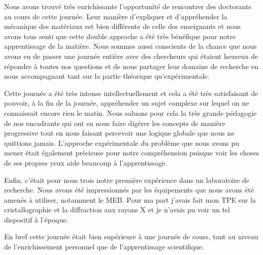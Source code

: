 Nous avons trouvé très enrichissante l'opportunité de rencontrer des doctorants au cours de cette journée. Leur manière d'expliquer et d'appréhender la mécanique des matériaux est bien différente de celle des enseignants et nous avons tous senti que cette double approche a été très bénéfique pour notre apprentissage de la matière. Nous sommes aussi conscients de la chance que nous avons eu de passer une journée entière avec des chercheurs qui étaient heureux de répondre à toutes nos questions et de nous partager leur domaine de recherche en nous accompagnant tant sur la partie théorique qu'expérimentale. 

Cette journée a été très intense intellectuellement et cela a été très satisfaisant de pouvoir, à la fin de la journée, appréhender un sujet complexe sur lequel on ne connaissait encore rien le matin. Nous saluons pour cela la très grande pédagogie de nos encadrants qui ont su nous faire digérer les concepts de manière progressive tout en nous faisant percevoir une logique globale que nous ne quittions jamais. L'approche expérimentale du problème que nous avons pu mener était également précieuse pour notre compréhension puisque voir les choses de ses propres yeux aide beaucoup à l'apprentissage.

Enfin, c'était pour nous trois notre première expérience dans un laboratoire de recherche. Nous avons été impressionnés par les équipements que nous avons été amenés à utiliser, notamment le MEB. Pour ma part j'avais fait mon TPE sur la cristallographie et la diffraction aux rayons X et je n'avais pu voir un tel dispositif à l'époque.

En bref cette journée était bien supérieure à une journée de cours, tant au niveau de l'enrichissement personnel que de l'apprentissage scientifique.